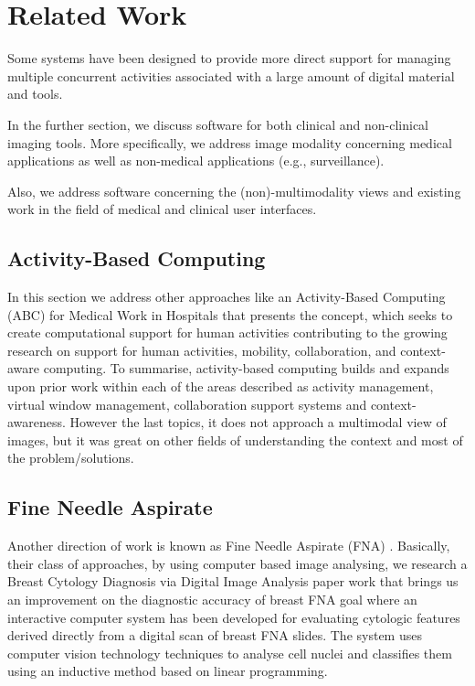 
\chapter{Related Work}
\label{chapter:related_work}

Some systems have been designed to provide more direct support for managing multiple concurrent activities associated with a large amount of digital material and tools.

In the further section, we discuss software for both clinical and non-clinical imaging tools. More specifically, we address image modality concerning medical applications as well as non-medical applications (e.g., surveillance).

Also, we address software concerning the (non)-multimodality views and existing work in the field of medical and clinical user interfaces.

\section{Activity-Based Computing}

In this section we address other approaches like an Activity-Based Computing (ABC) for Medical Work in Hospitals \cite{citeulike:4920996} that presents the concept, which seeks to create computational support for human activities contributing to the growing research on support for human activities, mobility, collaboration, and context-aware computing. To summarise, activity-based computing builds and expands upon prior work within each of the areas described as activity management, virtual window management, collaboration support systems and context-awareness. However the last topics, it does not approach a multimodal view of images, but it was great on other fields of understanding the context and most of the problem/solutions.

\section{Fine Needle Aspirate}

Another direction of work is known as Fine Needle Aspirate (FNA) \cite{ahmad2012breast}. Basically, their class of approaches, by using computer based image analysing, we research a Breast Cytology Diagnosis via Digital Image Analysis \cite{Mangasarian95breastcancer} paper work that brings us an improvement on the diagnostic accuracy of breast FNA goal where an interactive computer system has been developed for evaluating cytologic features derived directly from a digital scan of breast FNA slides. The system uses computer vision technology techniques to analyse cell nuclei and classifies them using an inductive method based on linear programming.

